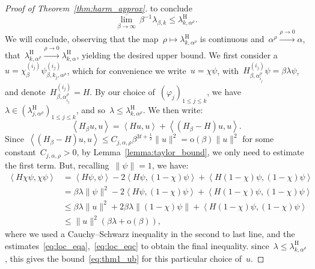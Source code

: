 \documentclass[10pt]{article}
\newcommand{\1}{\mathbbm 1}
\newcommand{\scalingExp}{t}
\newcommand{\shift}{\rho} %
\renewcommand{\o}{\mathrm{o}}
\begin{document}
\begin{proof}[Proof of Theorem~\ref{thm:harm_approx}]
        to conclude
        \[\underset{\beta\to\infty}{\overline\lim}\,\beta^{-1}\lambda_{\beta,k} \leq \lambda_{k,\alpha^\shift}^{\mathrm{H}}.\]
        We will conclude, observing that the map~$\shift\mapsto\lambda_{k,\alpha^\shift}^{\mathrm{H}}$ is continuous and~$\alpha^\shift \overset{\shift\to 0}{\longrightarrow} \alpha$, 
        that~$\lambda_{k,\alpha^\shift}^{\mathrm{H}}\overset{\shift\to 0}{\longrightarrow} \lambda_{k,\alpha}^{\mathrm H}$, yielding the desired upper bound.
        We first consider a~$u = \chi_\beta^{(i_j)} \psi_{\beta,k_j,\alpha^\shift}^{(i_j)}$, which for convenience we write~$u=\chi\psi$, with~$H_{\beta,\alpha_{i_j}^\shift}^{(i_j)} \psi = \beta\lambda\psi$, and denote~$H_{\beta,\alpha_{i_j}^\shift}^{(i_j)}=H$.
        By our choice of~$(\varphi_j)_{1\leq j\leq k}$, we have~$\lambda \in (\lambda_{j,\alpha^\shift}^{\mathrm H})_{1\leq j\leq k}$, and so~$\lambda\leq \lambda_{k,\alpha^\shift}^{\mathrm H}$.
        We then write:
        \[\left\langle H_\beta u,u\right\rangle = \left\langle H u,u\right\rangle + \left\langle (H_\beta - H)u,u\right\rangle.\]
        Since~$\left\langle (H_\beta-H)u,u\right\rangle \leq C_{j,\alpha,\shift}\beta^{3\scalingExp+\frac12}\|u\|^2 = \mathrm{o}(\beta)\|u\|^2$ for some constant~$C_{j,\alpha,\shift}>0$, by Lemma~\ref{lemma:taylor_bound}, we only need to estimate the first term.
        But, recalling~$\|\psi\| = 1$, we have:
        \[\begin{aligned}
            \left\langle H\chi\psi,\chi\psi\right\rangle &= \left\langle H\psi,\psi\right\rangle - 2\left\langle H\psi,(1-\chi)\psi\right\rangle + \left\langle H(1-\chi)\psi,(1-\chi)\psi\right\rangle\\
            & = \beta\lambda\|\psi\|^2 - 2\left\langle H\psi,(1-\chi)\psi\right\rangle + \left\langle H(1-\chi)\psi,(1-\chi)\psi\right\rangle\\
            &\leq \beta\lambda\|u\|^2 + 2\beta\lambda\|(1-\chi)\psi\| + \left\langle H(1-\chi)\psi,(1-\chi)\psi\right\rangle\\
            &\leq \|u\|^2(\beta\lambda+\mathrm{o}(\beta)),
        \end{aligned}\]
        where we used a Cauchy--Schwarz inequality in the second to last line, and the estimates~\eqref{eq:loc_eqa},~\eqref{eq:loc_eqc} to obtain the final inequality.
        since~$\lambda\leq \lambda_{k,\alpha^\shift}^{\mathrm H}$, this gives the bound~\eqref{eq:thm1_ub} for this particular choice of~$u$.

\end{proof}
\end{document}
